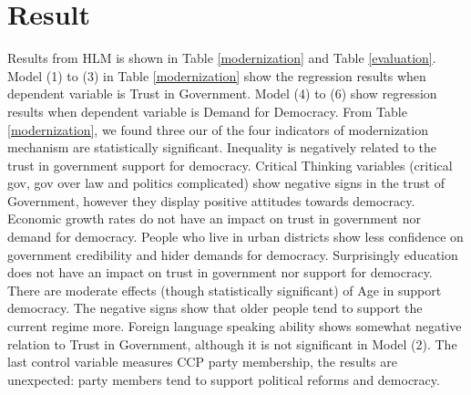\documentclass[12pt]{article}\usepackage[]{graphicx}\usepackage[]{color}
\begin{document}
\section{Result}
Results from HLM is shown in Table \ref{modernization} and Table \ref{evaluation}.
Model (1) to (3) in Table \ref{modernization} show the regression results when dependent variable is Trust in Government. Model (4) to (6) show regression results when dependent variable is Demand for Democracy.
From Table \ref{modernization}, we found three our of the four indicators of modernization mechanism are statistically significant. Inequality is negatively related to the trust in government support for democracy. Critical Thinking variables (critical gov, gov over law and politics complicated) show negative signs in the trust of Government, however they display positive attitudes towards democracy. Economic growth rates do not have an impact on trust in government nor demand for democracy. People who live in urban districts show less confidence on government credibility and hider demands for democracy. Surprisingly education does not have an impact on trust in government nor support for democracy. There are moderate effects (though statistically significant) of Age in support democracy. The negative signs show that older people tend to support the current regime more.
Foreign language speaking ability shows somewhat negative relation to Trust in Government, although it is not significant in Model (2). The last control variable measures CCP party membership, the results are unexpected: party members tend to support political reforms and democracy. 
\end{document}
